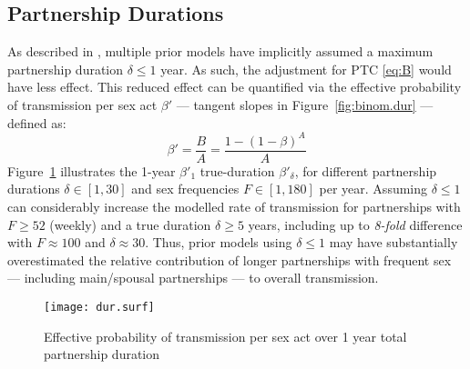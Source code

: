 \subsection{Partnership Durations}\label{foi.exp.dur}
As described in , multiple prior models have
implicitly assumed a maximum partnership duration $\delta \le 1$ year.
As such, the adjustment for PTC \eqref{eq:B} would have less effect.
This reduced effect can be quantified via
the effective probability of transmission per sex act $\beta'$
--- \ie tangent slopes in Figure~\ref{fig:binom.dur} --- defined as:
\begin{equation}\label{eq:beta.eff}
  \beta' = \frac{B}{A} = \frac{1 - {(1 - \beta)}^{A}}{A}
\end{equation}
Figure~\ref{fig:dur.surf} illustrates the 1-year $\beta'_1$ \vs true-duration $\beta'_\delta$, for
different partnership durations $\delta \in [1, 30]$ and sex frequencies $F \in [1,180]$ per year.
Assuming $\delta \le 1$ can considerably increase the modelled rate of transmission
for partnerships with $F \ge 52$ (\ie weekly) and a true duration $\delta \ge 5$ years,
including up to \emph{8-fold} difference with $F \approx 100$ and $\delta \approx 30$.
Thus, prior models using $\delta \le 1$ may have
substantially overestimated the relative contribution of
longer partnerships with frequent sex --- including main/spousal partnerships ---
to overall transmission.
\begin{figure}
  \centering\texttt{[image: dur.surf]}
  \caption{Effective probability of transmission per sex act
    over 1 year \vs total partnership duration}
  \label{fig:dur.surf}
\end{figure}
\pagebreak %
